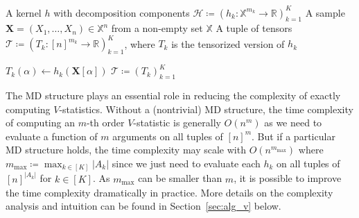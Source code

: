 \documentclass[twoside,11pt]{article}
\newcommand{\Lin}[1]{{\color{purple}{Lin: #1}}}
\newcommand{\Zhang}[1]{{\color{blue}{Zhang: #1}}}
\newcommand{\samplespace}{\bbX}
\newcommand{\less}{O}
\def\bbX{\mathbb{X}}
\def\calT{\mathcal{T}}
\def\calH{\mathcal{H}}
\newcommand{\reals}{{\mathbb{R}}}
\begin{document}
\begin{algorithm}
    \caption{Tensorization of Kernel Function}
    \label{alg:tensorization}
    \begin{algorithmic}[1]
        \Require 
            \Statex A kernel $h$ with decomposition components $\calH \coloneqq (h_k: \bbX^{m_k} \to \reals)_{k=1}^K$
            \Statex A sample $\bm{X} = (X_1, \dots, X_n) \in \samplespace^n$ from a non-empty set $\samplespace$
        \Ensure A tuple of tensors $\calT \coloneqq (T_k: [n]^{m_k} \to \reals)_{k=1}^K$, where $T_k$ is the tensorized version of $h_k$

        \Function{Tensorization}{$\calH, \bm{X}$}
                    \State $T_k(\alpha) \gets h_k(\bm{X}[\alpha])$  
                \EndFor
            \EndFor
            \State \Return $\calT \coloneqq (T_k)_{k=1}^K$  
        \EndFunction
    \end{algorithmic}
\end{algorithm}


The MD structure plays an essential role in reducing the complexity of exactly computing $V$-statistics. %
Without a (nontrivial) MD structure, the time complexity of computing an $m$-th order $V$-statistic is generally $\less (n^m)$ as we need to evaluate a function of $m$ arguments on all tuples of $[n]^m$. But if a particular MD structure holds, the time complexity may scale with $\less (n^{m_{\mathrm{max}}})$ where $m_{\mathrm{max}} \coloneqq \max_{k \in [K]} |A_k|$ since we just need to evaluate each  $h_k$ on all tuples of $[n]^{|A_k|}$ for $k \in [K]$. As $m_{\mathrm{max}}$ can be smaller than $m$, it is possible to improve the time complexity dramatically in practice. More details on the complexity analysis and intuition can be found in Section~\ref{sec:alg_v} below.
\end{document}
